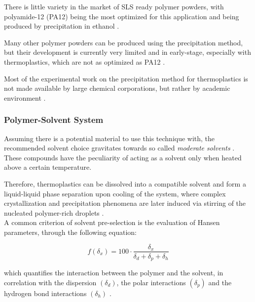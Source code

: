 \documentclass{article}
\begin{document}
    There is little variety in the market of SLS ready polymer powders, with polyamide-12 (PA12) being the most optimized for this 
    application and being produced by precipitation in ethanol \autocite*{DechetMaximilianA2020OtDo}.
    
    Many other polymer powders can be produced using the precipitation method, but their development is currently very limited 
    and in early-stage, especially with thermoplastics, which are not as optimized as PA12 \autocites{Kovalcik_PHA_Review}.
    
    Most of the experimental work on the precipitation method for thermoplastics is not made available by large chemical corporations, 
    but rather by academic environment \autocites{Kovalcik_PHA_Review}. 

    \subsubsection{Polymer-Solvent System \label{polymer_solvent_system}}

    Assuming there is a potential material to use this technique with, the recommended solvent choice gravitates towards 
    so called \textit{moderate solvents} \autocite*{DechetMaximilianA2020OtDo}. \\
    
    These compounds have the peculiarity of acting as a solvent only when heated above a certain temperature. 

    Therefore, thermoplastics can be dissolved into a compatible solvent and form a liquid-liquid phase separation
    upon cooling of the system, where complex crystallization and precipitation phenomena are later induced via stirring of 
    the nucleated polymer-rich droplets \autocite*{DechetMaximilianA2020OtDo}.  \\ 

    A common criterion of solvent pre-selection is the evaluation of Hansen parameters, through the following equation: 

    \begin{equation}
        \textit{f} (\delta_x) = 100 \cdot \frac{\delta_x}{\delta_d + \delta_p + \delta_h}
        \label{eq:hansen_parameters}
    \end{equation}

    which quantifies the interaction between the polymer and the solvent, in correlation with the dispersion $(\delta_d)$, 
    the polar interactions $(\delta_p)$ and the hydrogen bond interactions $(\delta_h)$ \autocite*{DechetMaximilianA2020OtDo}. 
\end{document}
